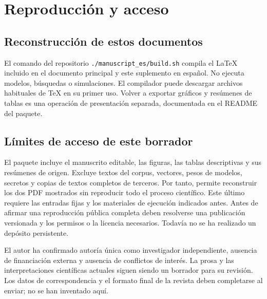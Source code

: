 \documentclass[12pt]{article}
\begin{document}
\section{Reproducción y acceso}

\subsection{Reconstrucción de estos documentos}
El comando del repositorio \nolinkurl{./manuscript_es/build.sh} compila el LaTeX incluido en el documento principal y este suplemento en español. No ejecuta modelos, búsquedas o simulaciones. El compilador puede descargar archivos habituales de TeX en su primer uso. Volver a exportar gráficos y resúmenes de tablas es una operación de presentación separada, documentada en el README del paquete.

\subsection{Límites de acceso de este borrador}
El paquete incluye el manuscrito editable, las figuras, las tablas descriptivas y sus resúmenes de origen. Excluye textos del corpus, vectores, pesos de modelos, secretos y copias de textos completos de terceros. Por tanto, permite reconstruir los dos PDF mostrados sin reproducir todo el proceso científico. Este último requiere las entradas fijas y los materiales de ejecución indicados antes. Antes de afirmar una reproducción pública completa deben resolverse una publicación versionada y los permisos o la licencia necesarios. Todavía no se ha realizado un depósito persistente.

El autor ha confirmado autoría única como investigador independiente, ausencia de financiación externa y ausencia de conflictos de interés. La prosa y las interpretaciones científicas actuales siguen siendo un borrador para su revisión. Los datos de correspondencia y el formato final de la revista deben completarse al enviar; no se han inventado aquí.

\FloatBarrier


\end{document}
